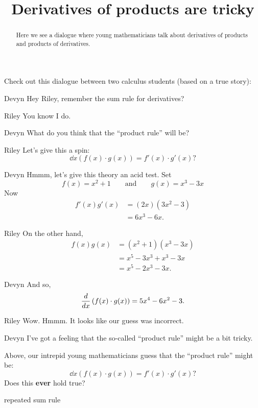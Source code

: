 \documentclass{ximera}
\title[Break-Ground:]{Derivatives of products are tricky}
\begin{document}
\begin{abstract}
Here we see a dialogue where young mathematicians talk about
derivatives of products and products of derivatives.
\end{abstract}
\maketitle

Check out this dialogue between two calculus students (based on a true
story):

\begin{dialogue}
\item[Devyn] Hey Riley, remember the sum rule for derivatives?
\item[Riley] You know I do.
\item[Devyn] What do you think that the ``product rule'' will be?
\item[Riley] Let's give this a spin:
  \[
  \dd{x} \left(f(x)\cdot g(x)\right) = f'(x) \cdot g'(x)?
  \]
\item[Devyn] Hmmm, let's give this theory an acid test. Set
  \[
  f(x) = x^2+1\qquad\text{and}\qquad g(x) = x^3-3x
  \]
  Now
  \begin{align*}
    f'(x)g'(x) &= (2x)(3x^2-3)\\
    &= 6x^3-6x.
  \end{align*}
\item[Riley] On the other hand,
  \begin{align*}
    f(x)g(x) &= (x^2+1)(x^3-3x)\\
    &=x^5-3x^3+x^3-3x\\
    &=x^5-2x^3-3x.
  \end{align*} 
\item[Devyn] And so, 
  \[
  \frac{d}{dx} \left(f(x) \cdot g(x)\right) = 5x^4-6x^2-3.
  \]
\item[Riley] Wow. Hmmm. It looks like our guess was incorrect.
\item[Devyn] I've got a feeling that the so-called ``product rule''
  might be a bit tricky.
\end{dialogue}

\begin{problem}
  Above, our intrepid young mathematicians guess that the ``product rule'' might be:
  \[
  \dd{x} \left(f(x)\cdot g(x)\right) = f'(x) \cdot g'(x)?
  \]
  Does this \textbf{ever} hold true?
  \begin{freeResponse}
  \end{freeResponse}
\end{problem}

\begin{problem}
  repeated sum rule
\end{problem}


\end{document}
